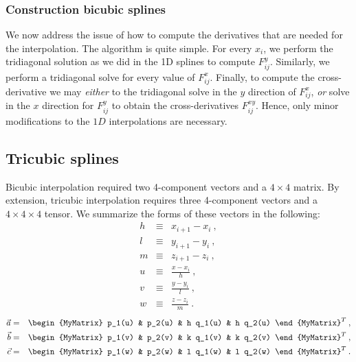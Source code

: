 \subsubsection{Construction bicubic splines}
We now address the issue of how to compute the derivatives that are
needed for the interpolation.  The algorithm is quite simple.  For
every $x_i$, we perform the tridiagonal solution as we did in the 1D
splines to compute $F^y_{ij}$.  Similarly, we perform a tridiagonal
solve for every value of $F^x_{ij}$.  Finally, to compute the
cross-derivative we may {\em either} to the tridiagonal solve in the $y$
direction of $F^x_{ij}$, {\em or} solve in the $x$ direction for
$F^y_{ij}$ to obtain the cross-derivatives $F^{xy}_{ij}$.  Hence,
only minor modifications to the $1D$ interpolations are necessary.

\subsection{Tricubic splines}
Bicubic interpolation required two 4-component vectors and a $4 \times 4$
matrix.  By extension, tricubic interpolation requires three
4-component vectors and a $4 \times 4 \times 4$ tensor.  We summarize the forms of
these vectors in the following:
\begin{eqnarray}
h & \equiv & x_{i+1}-x_i\:, \\
l & \equiv & y_{i+1}-y_i\:, \\
m & \equiv & z_{i+1}-z_i\:, \\
u & \equiv & \frac{x-x_i}{h}\:, \\
v & \equiv & \frac{y-y_i}{l}\:, \\
w & \equiv & \frac{z-z_i}{m}\:.
\end{eqnarray}
\begin{eqnarray}
\vec{a} & = & 
\begin{MyMatrix}
p_1(u) & p_2(u) & h q_1(u) & h q_2(u) 
\end{MyMatrix}^T\:, \\
\vec{b} & = & 
\begin{MyMatrix}
p_1(v) & p_2(v) & k q_1(v) & k q_2(v) 
\end{MyMatrix}^T\:, \\
\vec{c} & = & 
\begin{MyMatrix}
p_1(w) & p_2(w) & l q_1(w) & l q_2(w) 
\end{MyMatrix}^T\:. 
\end{eqnarray}
